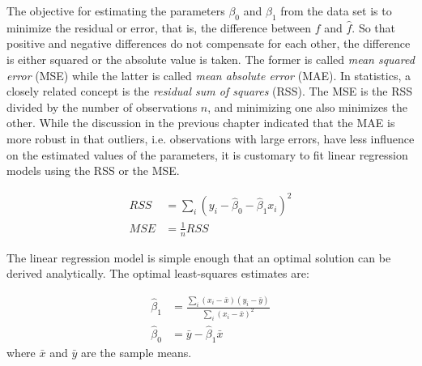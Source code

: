 The objective for estimating the parameters $\beta_0$ and $\beta_1$ from the data set is to minimize the residual or error, that is, the difference between $f$ and $\hat{f}$. So that positive and negative differences do not compensate for each other, the difference is either squared or the absolute value is taken. The former is called \emph{mean squared error} (MSE) while the latter is called \emph{mean absolute error} (MAE). In statistics, a closely related concept is the \emph{residual sum of squares} (RSS). The MSE is the RSS divided by the number of observations $n$, and minimizing one also minimizes the other. While the discussion in the previous chapter indicated that the MAE is more robust in that outliers, i.e. observations with large errors, have less influence on the estimated values of the parameters, it is customary to fit linear regression models using the RSS or the MSE.

\begin{align*}
RSS &= \sum_i \left( y_i - \hat{\beta}_0 - \hat{\beta}_1 x_i \right)^2 \\
MSE &= \frac{1}{n} RSS
\end{align*}

The linear regression model is simple enough that an optimal solution can be derived analytically. The optimal least-squares estimates are:

\begin{align*}
\hat{\beta}_1 &= \frac{\sum_i (x_i - \bar{x})(y_i - \bar{y})} {\sum_i (x_i - \bar{x})^2} \\
\hat{\beta}_0 &= \bar{y} - \hat{\beta}_1 \bar{x}
\end{align*}
\noindent where $\bar{x}$ and $\bar{y}$ are the sample means.




